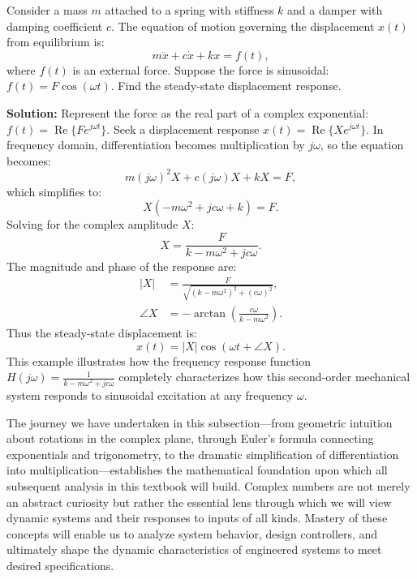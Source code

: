 \begin{example}
Consider a mass $m$ attached to a spring with stiffness $k$ and a damper with damping coefficient $c$. The equation of motion governing the displacement $x(t)$ from equilibrium is:
\begin{equation}
m\ddot{x} + c\dot{x} + kx = f(t),
\end{equation}
where $f(t)$ is an external force. Suppose the force is sinusoidal: $f(t) = F\cos(\omega t)$. Find the steady-state displacement response.

\textbf{Solution:} Represent the force as the real part of a complex exponential: $f(t) = \operatorname{Re}\{F e^{j\omega t}\}$. Seek a displacement response $x(t) = \operatorname{Re}\{X e^{j\omega t}\}$. In frequency domain, differentiation becomes multiplication by $j\omega$, so the equation becomes:
\begin{equation}
m(j\omega)^2 X + c(j\omega) X + kX = F,
\end{equation}
which simplifies to:
\begin{equation}
X\left(-m\omega^2 + jc\omega + k\right) = F.
\end{equation}
Solving for the complex amplitude $X$:
\begin{equation}
X = \frac{F}{k - m\omega^2 + jc\omega}.
\end{equation}
The magnitude and phase of the response are:
\begin{align}
|X| &= \frac{F}{\sqrt{(k - m\omega^2)^2 + (c\omega)^2}}, \\
\angle X &= -\arctan\left(\frac{c\omega}{k - m\omega^2}\right).
\end{align}
Thus the steady-state displacement is:
\begin{equation}
x(t) = |X|\cos(\omega t + \angle X).
\end{equation}
This example illustrates how the frequency response function $H(j\omega) = \frac{1}{k - m\omega^2 + jc\omega}$ completely characterizes how this second-order mechanical system responds to sinusoidal excitation at any frequency $\omega$.
\end{example}

The journey we have undertaken in this subsection—from geometric intuition about rotations in the complex plane, through Euler's formula connecting exponentials and trigonometry, to the dramatic simplification of differentiation into multiplication—establishes the mathematical foundation upon which all subsequent analysis in this textbook will build. Complex numbers are not merely an abstract curiosity but rather the essential lens through which we will view dynamic systems and their responses to inputs of all kinds. Mastery of these concepts will enable us to analyze system behavior, design controllers, and ultimately shape the dynamic characteristics of engineered systems to meet desired specifications.
